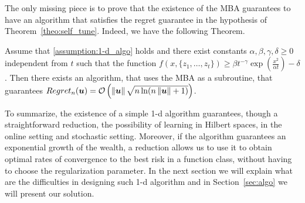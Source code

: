 The only missing piece is to prove that the existence of the \ac{MBA} guarantees to have an algorithm that satisfies the regret guarantee in the hypothesis of Theorem~\ref{theo:self_tune}. Indeed, we have the following Theorem.
\begin{theorem}
\label{theo:regret_pistol}
Assume that \ref{assumption:1-d_algo} holds and there exist constants $\alpha,\beta,\gamma,\delta\geq0$ independent from $t$ such that the function $f(x,\{z_1, \ldots, z_t\}) \geq \beta t^{-\gamma} \exp(\frac{x^2}{\alpha t})-\delta$.
Then there exists an algorithm, that uses the \ac{MBA} as a subroutine, that guarantees $Regret_n(\boldsymbol{u})=\mathcal{O}\left(\left\|{\boldsymbol{u}}\right\|\sqrt{n \ln(n \left\|{\boldsymbol{u}}\right\|+1)}\right)$.
\end{theorem}



To summarize, the existence of a simple 1-d algorithm guarantees, though a straightforward reduction, the possibility of learning in Hilbert spaces, in the online setting and stochastic setting. Moreover, if the algorithm guarantees an exponential growth of the wealth, a reduction allows us to use it to obtain optimal rates of convergence to the best risk in a function class, without having to choose the regularization parameter.
In the next section we will explain what are the difficulties in designing such 1-d algorithm and in Section~\ref{sec:algo} we will present our solution.